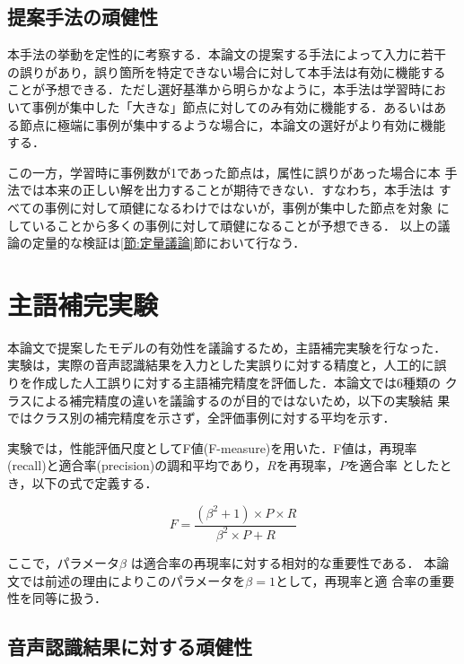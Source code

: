 \subsection{提案手法の頑健性}
\label{節:定性議論}

本手法の挙動を定性的に考察する．本論文の提案する手法によって入力に若干
の誤りがあり，誤り箇所を特定できない場合に対して本手法は有効に機能する
ことが予想できる．ただし選好基準から明らかなように，本手法は学習時にお
いて事例が集中した「大きな」節点に対してのみ有効に機能する．あるいはあ
る節点に極端に事例が集中するような場合に，本論文の選好がより有効に機能
する．

この一方，学習時に事例数が1であった節点は，属性に誤りがあった場合に本
手法では本来の正しい解を出力することが期待できない．すなわち，本手法は
すべての事例に対して頑健になるわけではないが，事例が集中した節点を対象
にしていることから多くの事例に対して頑健になることが予想できる．
以上の議論の定量的な検証は\ref{節:定量議論}節において行なう．




\section{主語補完実験}

本論文で提案したモデルの有効性を議論するため，主語補完実験を行なった．
実験は，実際の音声認識結果を入力とした実誤りに対する精度と，人工的に誤
りを作成した人工誤りに対する主語補完精度を評価した．本論文では6種類の
クラスによる補完精度の違いを議論するのが目的ではないため，以下の実験結
果ではクラス別の補完精度を示さず，全評価事例に対する平均を示す．

実験では，性能評価尺度としてF値(F-measure)を用いた．F値は，再現率
(recall)と適合率(precision)の調和平均であり，$R$を再現率，$P$を適合率
としたとき，以下の式で定義する．

\begin{equation}
F = \frac{(\beta^2 + 1) \times P \times R}{\beta^2 \times P + R}
\end{equation}
\vspace{3mm}

ここで，パラメータ$\beta$ は適合率の再現率に対する相対的な重要性である．
本論文では前述の理由によりこのパラメータを$\beta=1$として，再現率と適
合率の重要性を同等に扱う．



\subsection{音声認識結果に対する頑健性}

